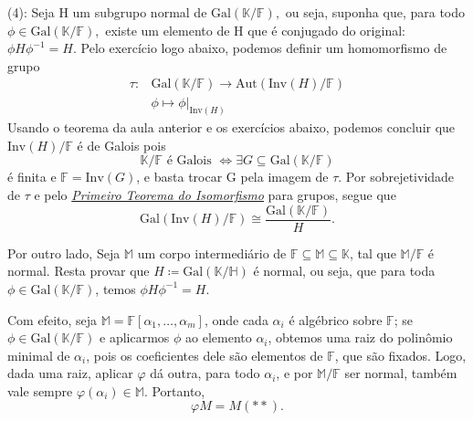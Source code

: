 \documentclass[../algebraIII_notes.tex]{subfiles}
\begin{document}
\begin{proof*}
	(4): Seja H um subgrupo normal de \(\mathrm{Gal}(\mathbb{K}/\mathbb{F}),\) ou seja, suponha que, para todo \(\phi \in \mathrm{Gal}(\mathbb{K}/\mathbb{F}),\) existe um elemento de H que é conjugado do original: \(\phi H \phi^{-1}=H\).
	Pelo exercício logo abaixo, podemos definir um homomorfismo de grupo
	\begin{align*}
		\tau : & \mathrm{Gal}(\mathbb{K}/\mathbb{F})\rightarrow \mathrm{Aut}(\mathrm{Inv}(H)/\mathbb{F}) \\
		       & \phi\longmapsto \phi|_{\mathrm{Inv}(H)}
	\end{align*}
	Usando o teorema da aula anterior e os exercícios abaixo, podemos concluir que \(\mathrm{Inv}(H)/\mathbb{F}\) é de Galois pois
	\[
		\mathbb{K}/\mathbb{F} \text{ é Galois } \Longleftrightarrow \exists G \subseteq \mathrm{Gal}(\mathbb{K}/\mathbb{F})
	\]
	é finita e \(\mathbb{F} = \mathrm{Inv}(G)\), e basta trocar G pela imagem de \(\tau \). Por sobrejetividade de \(\tau \) e pelo \hyperlink{isomorphism_theorem}{\textit{Primeiro Teorema do Isomorfismo}} para grupos, segue que
	\[
		\mathrm{Gal}(\mathrm{Inv}(H)/\mathbb{F})\cong \frac{\mathrm{Gal}(\mathbb{K}/\mathbb{F})}{H}.
	\]

	Por outro lado, Seja \(\mathbb{M}\) um corpo intermediário de \(\mathbb{F}\subseteq \mathbb{M}\subseteq \mathbb{K}\), tal que \(\mathbb{M}/\mathbb{F}\) é normal. Resta provar que \(H\coloneqq \mathrm{Gal}(\mathbb{K}/\mathbb{H})\) é normal, ou seja, que para toda \(\phi \in \mathrm{Gal}(\mathbb{K}/\mathbb{F})\), temos \(\phi H\phi^{-1}=H\).

	Com efeito, seja \(\mathbb{M} = \mathbb{F}[\alpha_1, \dotsc , \alpha_{m}]\), onde cada \(\alpha_{i}\) é algébrico sobre \(\mathbb{F}\); se \(\phi \in \mathrm{Gal}(\mathbb{K}/\mathbb{F})\) e aplicarmos \(\phi \) ao elemento \(\alpha_{i}\), obtemos uma raiz do polinômio minimal de \(\alpha_{i}\), pois os coeficientes dele são elementos de \(\mathbb{F}\), que são fixados. Logo, dada uma raiz, aplicar \(\varphi \) dá outra, para todo \(\alpha_{i}\), e por \(\mathbb{M}/\mathbb{F}\) ser normal, também vale sempre \(\varphi (\alpha_{i})\in \mathbb{M}\). Portanto,
	\[
		\varphi M = M (**).
	\]

\end{proof*}
\end{document}
